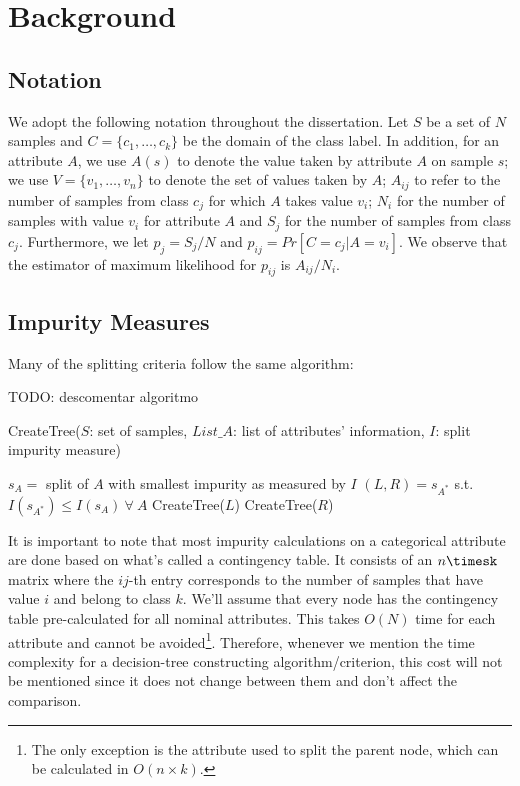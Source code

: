\newpage

\chapter{Background}
\label{chap:background}

\section{Notation}
\label{sec:notation}
We adopt the following notation throughout the dissertation.
Let $S$ be a set of $N$ samples and 
 $C=\{c_1,\ldots,c_k\}$ be the domain of the class label. 
In addition, for an attribute  $A$, we use $A(s)$ to denote the value taken by attribute
$A$ on sample $s$; we use 
  $V=\{ v_1,\ldots,v_n \}$ to denote the set of values
taken by $A$;
$A_{ij}$ to refer to the  number of samples
from class $c_j$ for which  $A$ takes value $v_i$; 
 $N_i$ for the number of samples with value $v_i$ for attribute $A$
and $S_j$ for the number of samples from class $c_j$.
Furthermore, we let $p_j = S_j /N$ and $p_{ij}= Pr[C=c_j | A = v_i]$.
We observe that the estimator of maximum likelihood for $p_{ij} $ is
$A_{ij} / N_i$.  

\section{Impurity Measures}
Many of the splitting criteria follow the same algorithm:

TODO: descomentar algoritmo


\begin{algorithm}[tb]
   \caption{CreateTree($S$: set of samples, $List\_A$: list of attributes' information, $I$: split impurity measure)}
   \label{alg:create-tree}
\begin{algorithmic}
\STATE $s_A = $ split of $A$ with smallest impurity as measured by $I$
\ENDFOR
\STATE $(L, R) = s_{A^*}$ s.t. $I(s_{A^*}) \leq I(s_A) ~\forall ~ A$
\STATE CreateTree($L$)
\STATE CreateTree($R$)
\ENDIF
\end{algorithmic}
\end{algorithm}

It is important to note that most impurity calculations on a categorical attribute are done based on what's called a contingency table. It consists of an $n\timesk$ matrix where the $ij$-th entry corresponds to the number of samples that have value $i$ and belong to class $k$. We'll assume that every node has the contingency table pre-calculated for all nominal attributes. This takes $O(N)$ time for each attribute and cannot be avoided\footnote{The only exception is the attribute used to split the parent node, which can be calculated in $O(n\times k)$.}. Therefore, whenever we mention the time complexity for a decision-tree constructing algorithm/criterion, this cost will not be mentioned since it does not change between them and don't affect the comparison.

